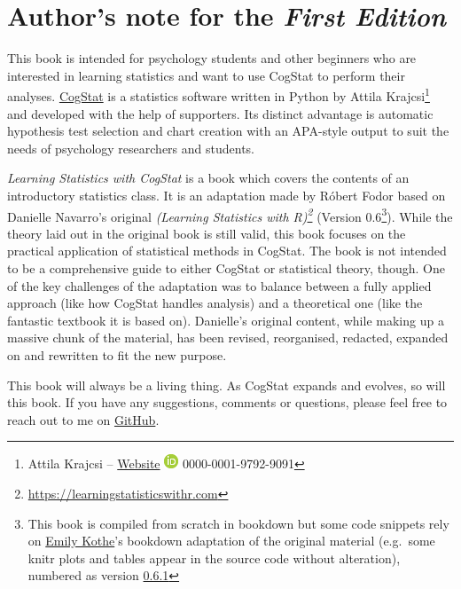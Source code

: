 \documentclass[
  11pt,
]{book}
\theoremstyle{indenteddefinition}
\theoremstyle{indenteddefinition}
\theoremstyle{definition}
\theoremstyle{definition}
\theoremstyle{remark}
\begin{document}
\hypertarget{authors-note-for-the-first-edition}{%
\section*{\texorpdfstring{Author's note for the \emph{First Edition}}{Author's note for the First Edition}}\label{authors-note-for-the-first-edition}}

This book is intended for psychology students and other beginners who are interested in learning statistics and want to use CogStat to perform their analyses. \href{https://www.cogstat.org}{CogStat} is a statistics software written in Python by Attila Krajcsi\footnote{Attila Krajcsi -- \href{http://www.attilakrajcsi.hu}{Website} \textbar{} \href{https://orcid.org/0000-0001-9792-9091}{\includegraphics{resources/image/orcid_16x16.png}} 0000-0001-9792-9091} and developed with the help of supporters. Its distinct advantage is automatic hypothesis test selection and chart creation with an APA-style output to suit the needs of psychology researchers and students.

\emph{Learning Statistics with CogStat} is a book which covers the contents of an introductory statistics class. It is an adaptation made by Róbert Fodor based on Danielle Navarro's original \emph{(Learning Statistics with R)\footnote{\url{https://learningstatisticswithr.com}}} (Version 0.6\footnote{This book is compiled from scratch in bookdown but some code snippets rely on \href{https://twitter.com/emilyandthelime}{Emily Kothe}'s bookdown adaptation of the original material (e.g.~some knitr plots and tables appear in the source code without alteration), numbered as version \href{https://learningstatisticswithr.com/book/}{0.6.1}}). While the theory laid out in the original book is still valid, this book focuses on the practical application of statistical methods in CogStat. The book is not intended to be a comprehensive guide to either CogStat or statistical theory, though. One of the key challenges of the adaptation was to balance between a fully applied approach (like how CogStat handles analysis) and a theoretical one (like the fantastic textbook it is based on). Danielle's original content, while making up a massive chunk of the material, has been revised, reorganised, redacted, expanded on and rewritten to fit the new purpose.

This book will always be a living thing. As CogStat expands and evolves, so will this book. If you have any suggestions, comments or questions, please feel free to reach out to me on \href{https://github.com/robertfodor/lsc/issues}{GitHub}.
\end{document}
